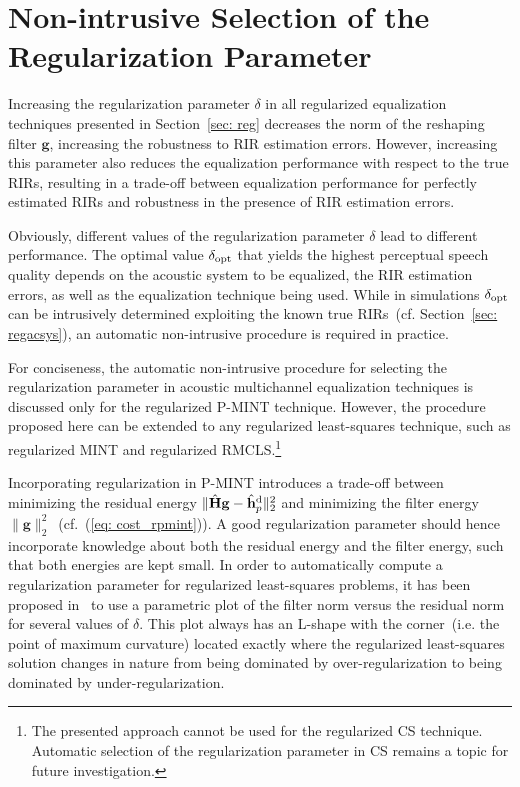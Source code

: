 \documentclass[10pt]{IEEEtran}
\begin{document}
\section{Non-intrusive Selection of the Regularization Parameter}
\label{sec: sel_reg}
Increasing the regularization parameter $\delta$ in all regularized equalization techniques presented in Section~\ref{sec: reg} decreases the norm of the reshaping filter $\mathbf{g}$, increasing the robustness to RIR estimation errors.
However, increasing this parameter also reduces the equalization performance with respect to the true RIRs, resulting in a trade-off between equalization performance for perfectly estimated RIRs and robustness in the presence of RIR estimation errors.

Obviously, different values of the regularization parameter $\delta$ lead to different performance.
The optimal value $\delta_{\rm opt}$ that yields the highest perceptual speech quality depends on the acoustic system to be equalized, the RIR estimation errors, as well as the equalization technique being used.
While in simulations $\delta_{\rm opt}$ can be intrusively determined exploiting the known true RIRs~(cf. Section~\ref{sec: regacsys}), an automatic non-intrusive procedure is required in practice.

For conciseness, the automatic non-intrusive procedure for selecting the regularization parameter in acoustic multichannel equalization techniques is discussed only for the regularized P-MINT technique.
However, the procedure proposed here can be extended to any regularized least-squares technique, such as regularized MINT and regularized RMCLS.\footnote{The presented approach cannot be used for the regularized CS technique. Automatic selection of the regularization parameter in CS remains a topic for future investigation.}

Incorporating regularization in P-MINT introduces a trade-off between minimizing the residual energy $\|\hat{\mathbf{H}}\mathbf{g} - \hat{\mathbf{h}}_p^{\rm d} \|_2^2$ and minimizing the filter energy $\|\mathbf{g}\|_2^2$~(cf.~(\ref{eq: cost_rpmint})).
A good regularization parameter should hence incorporate knowledge about both the residual energy and the filter energy, such that both energies are kept small.
In order to automatically compute a regularization parameter for regularized least-squares problems, it has been proposed in~\cite{Hansen_1993} to use a parametric plot of the filter norm versus the residual norm for several values of $\delta$.
This plot always has an L-shape with the corner~(i.e. the point of maximum curvature) located exactly where the regularized least-squares solution changes in nature from being dominated by over-regularization to being dominated by under-regularization.
\end{document}
